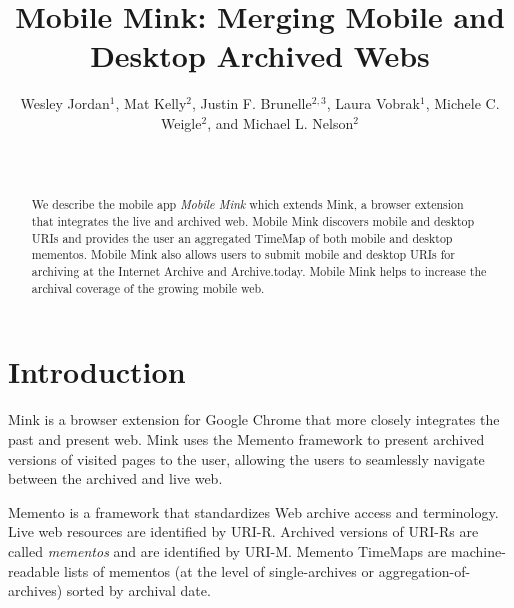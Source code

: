 \documentclass{sig-alternate-2013}
\begin{document}
\title{Mobile Mink: Merging Mobile and Desktop Archived Webs}





\author{\alignauthor Wesley Jordan$^1$, Mat Kelly$^2$, Justin F. Brunelle$^{2,3}$, Laura Vobrak$^1$, Michele C. Weigle$^2$, and Michael L. Nelson$^2$ \\
\\
\\
} 




\maketitle
\begin{abstract}
We describe the mobile app \emph{Mobile Mink} which extends Mink, a browser extension that integrates the live and archived web. Mobile Mink discovers mobile and desktop URIs and provides the user an aggregated TimeMap of both mobile and desktop mementos. Mobile Mink also allows users to submit mobile and desktop URIs for archiving at the Internet Archive and Archive.today. Mobile Mink helps to increase the archival coverage of the growing mobile web.
\end{abstract}




\section{Introduction}
\label{introduction}
Mink \cite{mink} is a browser extension for Google Chrome that more closely integrates the past and present web. Mink uses the Memento framework \cite{nelson:memento:tr} to present archived versions of visited pages to the user, allowing the users to seamlessly navigate between the archived and live web.

Memento is a framework that standardizes Web archive access and terminology. Live web resources are identified by URI-R. Archived versions of URI-Rs are called \emph{mementos} and are identified by URI-M. Memento TimeMaps are machine-readable lists of mementos (at the level of single-archives or aggregation-of-archives) sorted by archival date.
\end{document}
